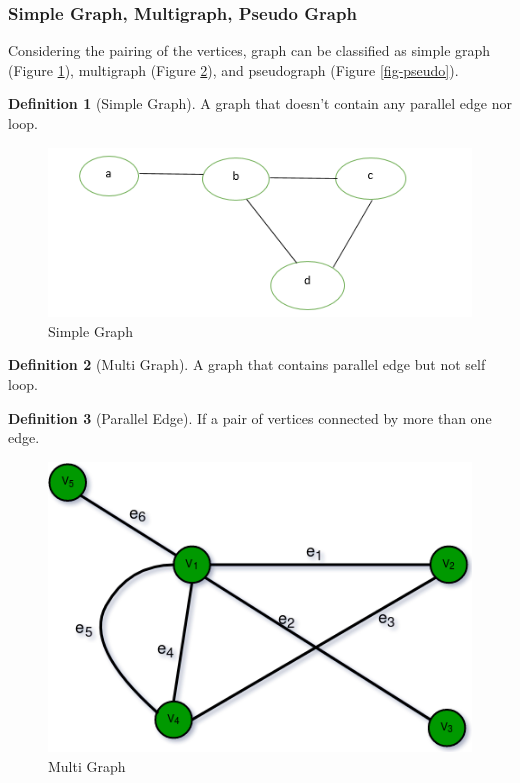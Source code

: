 \documentclass{article}
\theoremstyle{plain}%
\theoremstyle{definition}
\newtheorem{defn}{Definition}[section]
\theoremstyle{remark}
\begin{document}
	\subsubsection{Simple Graph, Multigraph, Pseudo Graph}

	Considering the pairing of the vertices, graph can be classified as simple graph
	(Figure \ref{fig-simple}), multigraph (Figure \ref{fig-multi}), and pseudograph (Figure \ref{fig-pseudo}).

	\begin{defn}[Simple Graph]
		A graph that doesn't contain any parallel edge nor loop.
	\end{defn}

	\begin{figure}[htbp]
		\center
		\includegraphics[scale=0.5]{img/simple-graph.png}
		\caption{Simple Graph}
		\label{fig-simple}
	\end{figure}

	\begin{defn}[Multi Graph]
		A graph that contains parallel edge but not self loop.
	\end{defn}

	\begin{defn}[Parallel Edge]
		If a pair of vertices connected by more than one edge.
	\end{defn}

	\begin{figure}[htbp]
		\center
		\includegraphics[scale=0.4]{img/multi-graph.png}
		\caption{Multi Graph}
		\label{fig-multi}
	\end{figure}
\end{document}
